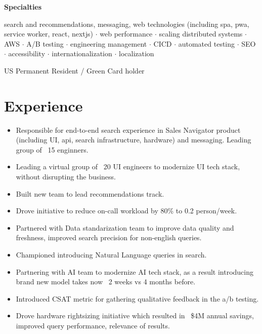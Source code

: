\documentclass[11pt,a4paper,roman]{moderncv}       %
\begin{document}
\small{\textbf{Specialties} 
\begin{center}
search and recommendations, messaging, web technologies (including spa, pwa, service worker, react, nextjs) ${\cdot}$ web performance ${\cdot}$ scaling distributed systems ${\cdot}$ AWS ${\cdot}$ A/B testing ${\cdot}$ engineering management ${\cdot}$  CICD ${\cdot}$ automated testing ${\cdot}$ SEO ${\cdot}$ accessibility ${\cdot}$ internationalization ${\cdot}$ localization  
\end{center}
\bigskip

US Permanent Resident / Green Card holder

\section{Experience}


\begin{itemize}
    \item Responsible for end-to-end search experience in Sales Navigator product (including UI, api, search infrastructure, hardware) and messaging. Leading group of ~15 enginners.
    \item Leading a virtual group of ~20 UI engineers to modernize UI tech stack, without disrupting the business.
    \item Built new team to lead recommendations track. 
    \item Drove initiative to reduce on-call workload by 80\% to 0.2 person/week.
    \item Partnered with Data standarization team to improve data quality and freshness, improved search precision for non-english queries.
    \item Championed introducing Natural Language queries in search.
    \item Partnering with AI team to modernize AI tech stack, as a result introducing brand new model takes now ~2 weeks vs 4 months before.
    \item Introduced CSAT metric for gathering qualitative feedback in the a/b testing.
    \item Drove hardware rightsizing initiative which resulted in ~\$4M annual savings, improved query performance, relevance of results.
    
\end{itemize}

\bigskip

}
\end{document}
